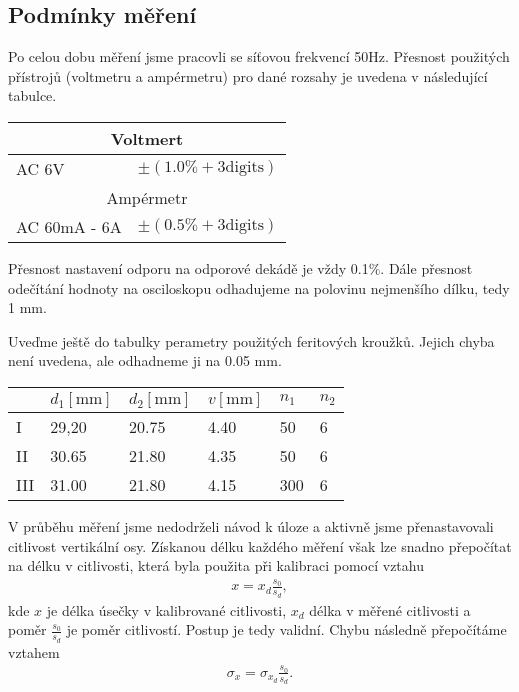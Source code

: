 \documentclass{article}
\begin{document}
\subsection{Podmínky měření}
\par Po celou dobu měření jsme pracovli se síťovou frekvencí 50Hz. Přesnost použitých přístrojů (voltmetru a ampérmetru) pro dané rozsahy je uvedena v následující tabulce. 
\begin{center}
    \label{tab:title} 
    \begin{tabular}[h!]{| l | l |}
    \hline
     \multicolumn{2}{|c|}{Voltmert} \\
     \hline
    AC 6$\mathrm{V}$  & $\pm(1.0\mathrm{\%} + 3\mathrm{digits})$  \\ \hline
    \multicolumn{2}{|c|}{Ampérmetr} \\
    \hline
    AC 60$\mathrm{mA}$ - 6$\mathrm{A}$ & $\pm(0.5\mathrm{\%} + 3\mathrm{digits})$ \\ \hline
    \end{tabular}
\end{center}

Přesnost nastavení odporu na odporové dekádě je vždy 0.1$\mathrm{\%}$. Dále přesnost odečítání hodnoty na osciloskopu odhadujeme na polovinu nejmenšího dílku, tedy 1 mm.
\par Uveďme ještě do tabulky perametry použitých feritových kroužků. Jejich chyba není uvedena, ale odhadneme ji na 0.05 mm.
\begin{center}
    \label{tab:title} 
    \begin{tabular}[h!]{| l | l | l | l | l | l |}
    \hline
     & $d_1 [\mathrm{mm}]$ & $d_2 [\mathrm{mm}]$ & $v [\mathrm{mm}]$ & $n_1$ & $n_2$ \\ \hline \hline
    I   & 29,20 & 20.75 & 4.40 & 50  & 6  \\ \hline
    II  & 30.65 & 21.80 & 4.35 & 50  & 6  \\ \hline
    III & 31.00 & 21.80 & 4.15 & 300 & 6  \\ \hline
    \end{tabular}
\end{center}
\par V průběhu měření jsme nedodrželi návod k úloze a aktivně jsme přenastavovali citlivost vertikální osy. Získanou délku každého měření však lze snadno přepočítat na délku v citlivosti, která byla použita při kalibraci pomocí vztahu
\begin{align}
    x = x_d \frac{s_0}{s_d},
\end{align}
kde $x$ je délka úsečky v kalibrované citlivosti, $x_d$ délka v měřené citlivosti a poměr $\frac{s_0}{s_d}$ je poměr citlivostí. Postup je tedy validní. Chybu následně přepočítáme vztahem
\begin{align}
    \sigma_x = \sigma_{x_d} \frac{s_0}{s_d}.
\end{align}
\end{document}

